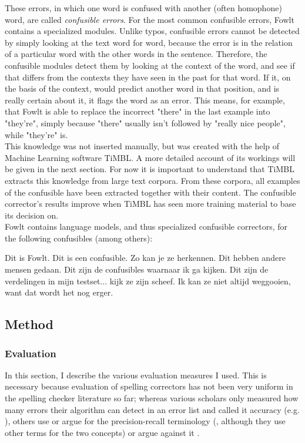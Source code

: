 \documentclass[12pt]{article}
\begin{document}
These errors, in which one word is confused with another (often homophone) word, are called \emph{confusible errors}. For the most common confusible errors, Fowlt contains a specialized modules. Unlike typos, confusible errors cannot be detected by simply looking at the text word for word, because the error is in the relation of a particular word with the other words in the sentence. Therefore, the confusible modules detect them by looking at the context of the word, and see if that differs from the contexts they have seen in the past for that word. If it, on the basis of the context, would predict another word in that position, and is really certain about it, it flags the word as an error. This means, for example, that Fowlt is able to replace the incorrect "there" in the last example into "they're", simply because "there" usually isn't followed by "really nice people", while "they're" is. \\\indent
This knowledge was not inserted manually, but was created with the help of Machine Learning software TiMBL. A more detailed account of its workings will be given in the next section. For now it is important to understand that TiMBL extracts this knowledge from large text corpora. From these corpora, all examples of the confusible have been extracted together with their content. The confusible corrector's results improve when TiMBL has seen more training material to base its decision on.\\\indent
Fowlt contains language models, and thus specialized confusible correctors, for the following confusibles (among others):

Dit is Fowlt. Dit is een confusible. Zo kan je ze herkennen. Dit hebben andere mensen gedaan. Dit zijn de confusibles waarnaar ik ga kijken. Dit zijn de verdelingen in mijn testset... kijk ze zijn scheef. Ik kan ze niet altijd weggooien, want dat wordt het nog erger. 

\subsection{Method}


\subsubsection{Evaluation}

In this section, I describe the various evaluation measures I used. This is necessary because evaluation of spelling correctors has not been very uniform in the spelling checker literature so far; whereas various scholars only measured how many errors their algorithm can detect in an error list and called it accuracy (e.g. \citealp{agirre98, bm00, tm02,vandelden04}), others use or argue for the precision-recall terminology (\citealp{reynaert08,pz84}, although they use other terms for the two concepts) or argue against it \citep{sp02}.\\\indent
\end{document}
